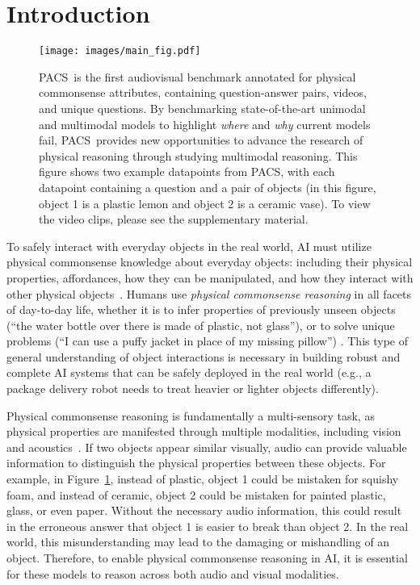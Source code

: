 \documentclass[runningheads]{llncs}
\newcommand{\names}{\textsc{PACS}}
\begin{document}
\section{Introduction}


\begin{figure}[t]
  \centering
  \texttt{[image: images/main\_fig.pdf]}
\caption{\names\ is the first audiovisual benchmark annotated for physical commonsense attributes, containing  question-answer pairs,  videos, and  unique questions. By benchmarking state-of-the-art unimodal and multimodal models to highlight \textit{where} and \textit{why} current models fail, \names\ provides new opportunities to advance the research of physical reasoning through studying multimodal reasoning. This figure shows two example datapoints from \names, with each datapoint containing a question and a pair of objects (in this figure, object 1 is a plastic lemon and object 2 is a ceramic vase). To view the video clips, please see the supplementary material.}
  \label{fig:dataset_example}
\end{figure}

To safely interact with everyday objects in the real world, AI must utilize physical commonsense knowledge about everyday objects: including their physical properties, affordances, how they can be manipulated, and how they interact with other physical objects~\cite{bisk2020piqa,hespos2004conceptual}. Humans use \textit{physical commonsense reasoning} in all facets of day-to-day life, whether it is to infer properties of previously unseen objects (``the water bottle over there is made of plastic, not glass''), or to solve unique problems (``I can use a puffy jacket in place of my missing pillow'') \cite{bisk2020piqa}. This type of general understanding of object interactions is necessary in building robust and complete AI systems that can be safely deployed in the real world (e.g., a package delivery robot needs to treat heavier or lighter objects differently).

Physical commonsense reasoning is fundamentally a multi-sensory task, as physical properties are manifested through multiple modalities, including vision and acoustics~\cite{corlett2018conditioned,minsky2000commonsense,zhang2017shape}. If two objects appear similar visually, audio can provide valuable information to distinguish the physical properties between these objects. For example, in Figure~\ref{fig:dataset_example}, instead of plastic, object 1 could be mistaken for squishy foam, and instead of ceramic, object 2 could be mistaken for painted plastic, glass, or even paper. Without the necessary audio information, this could result in the erroneous answer that object 1 is easier to break than object 2. In the real world, this misunderstanding may lead to the damaging or mishandling of an object. Therefore, to enable physical commonsense reasoning in AI, it is essential for these models to reason across both audio and visual modalities.
\end{document}
